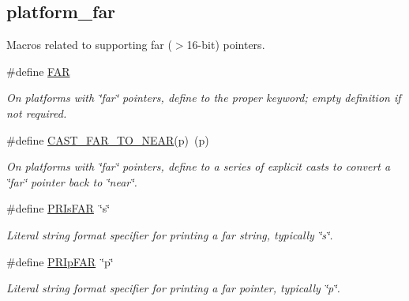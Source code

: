 \subsection*{platform\-\_\-far}
\label{_amgrpa1b148d56cbfc1db797440591bed5acf}%
Macros related to supporting far ($>$16-\/bit) pointers. \begin{DoxyCompactItemize}
\item 
\hypertarget{group__hal_gaef060b3456fdcc093a7210a762d5f2ed}{\#define \hyperlink{group__hal_gaef060b3456fdcc093a7210a762d5f2ed}{F\-A\-R}}\label{group__hal_gaef060b3456fdcc093a7210a762d5f2ed}

\begin{DoxyCompactList}\small\item\em On platforms with \char`\"{}far\char`\"{} pointers, define to the proper keyword; empty definition if not required. \end{DoxyCompactList}\item 
\#define \hyperlink{group__hal_ga0220c5cb877cc5718402ab41b91b7252}{C\-A\-S\-T\-\_\-\-F\-A\-R\-\_\-\-T\-O\-\_\-\-N\-E\-A\-R}(p)~(p)
\begin{DoxyCompactList}\small\item\em On platforms with \char`\"{}far\char`\"{} pointers, define to a series of explicit casts to convert a \char`\"{}far\char`\"{} pointer back to \char`\"{}near\char`\"{}. \end{DoxyCompactList}\item 
\hypertarget{group__hal_ga379022d2cd3136d8f3500c88658056b7}{\#define \hyperlink{group__hal_ga379022d2cd3136d8f3500c88658056b7}{P\-R\-Is\-F\-A\-R}~\char`\"{}s\char`\"{}}\label{group__hal_ga379022d2cd3136d8f3500c88658056b7}

\begin{DoxyCompactList}\small\item\em Literal string format specifier for printing a far string, typically {\ttfamily \char`\"{}s\char`\"{}}. \end{DoxyCompactList}\item 
\hypertarget{group__hal_ga8429a3beb3448b89cb7c3877b8909369}{\#define \hyperlink{group__hal_ga8429a3beb3448b89cb7c3877b8909369}{P\-R\-Ip\-F\-A\-R}~\char`\"{}p\char`\"{}}\label{group__hal_ga8429a3beb3448b89cb7c3877b8909369}

\begin{DoxyCompactList}\small\item\em Literal string format specifier for printing a far pointer, typically {\ttfamily \char`\"{}p\char`\"{}}. \end{DoxyCompactList}\end{DoxyCompactItemize}
